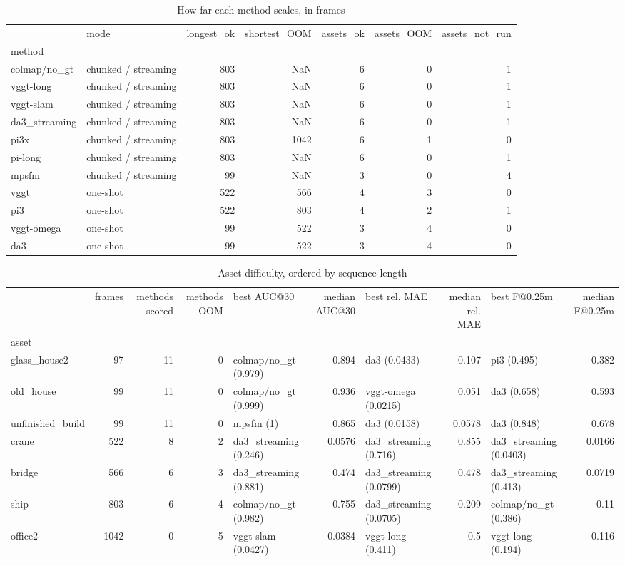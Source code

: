 \begin{table}
\caption{How far each method scales, in frames}
\label{tab:t2_scaling}
\begin{tabular}{llrrrrr}
\toprule
 & mode & longest\_ok & shortest\_OOM & assets\_ok & assets\_OOM & assets\_not\_run \\
method &  &  &  &  &  &  \\
\midrule
colmap/no\_gt & chunked / streaming & 803 & NaN & 6 & 0 & 1 \\
vggt-long & chunked / streaming & 803 & NaN & 6 & 0 & 1 \\
vggt-slam & chunked / streaming & 803 & NaN & 6 & 0 & 1 \\
da3\_streaming & chunked / streaming & 803 & NaN & 6 & 0 & 1 \\
pi3x & chunked / streaming & 803 & 1042 & 6 & 1 & 0 \\
pi-long & chunked / streaming & 803 & NaN & 6 & 0 & 1 \\
mpsfm & chunked / streaming & 99 & NaN & 3 & 0 & 4 \\
vggt & one-shot & 522 & 566 & 4 & 3 & 0 \\
pi3 & one-shot & 522 & 803 & 4 & 2 & 1 \\
vggt-omega & one-shot & 99 & 522 & 3 & 4 & 0 \\
da3 & one-shot & 99 & 522 & 3 & 4 & 0 \\
\bottomrule
\end{tabular}
\end{table}


\begin{table}
\caption{Asset difficulty, ordered by sequence length}
\label{tab:t3_asset_difficulty}
\begin{tabular}{lrrrlrlrlr}
\toprule
 & frames & methods scored & methods OOM & best AUC@30 & median AUC@30 & best rel. MAE & median rel. MAE & best F@0.25m & median F@0.25m \\
asset &  &  &  &  &  &  &  &  &  \\
\midrule
glass\_house2 & 97 & 11 & 0 & colmap/no\_gt (0.979) & 0.894 & da3 (0.0433) & 0.107 & pi3 (0.495) & 0.382 \\
old\_house & 99 & 11 & 0 & colmap/no\_gt (0.999) & 0.936 & vggt-omega (0.0215) & 0.051 & da3 (0.658) & 0.593 \\
unfinished\_build & 99 & 11 & 0 & mpsfm (1) & 0.865 & da3 (0.0158) & 0.0578 & da3 (0.848) & 0.678 \\
crane & 522 & 8 & 2 & da3\_streaming (0.246) & 0.0576 & da3\_streaming (0.716) & 0.855 & da3\_streaming (0.0403) & 0.0166 \\
bridge & 566 & 6 & 3 & da3\_streaming (0.881) & 0.474 & da3\_streaming (0.0799) & 0.478 & da3\_streaming (0.413) & 0.0719 \\
ship & 803 & 6 & 4 & colmap/no\_gt (0.982) & 0.755 & da3\_streaming (0.0705) & 0.209 & colmap/no\_gt (0.386) & 0.11 \\
office2 & 1042 & 0 & 5 & vggt-slam (0.0427) & 0.0384 & vggt-long (0.411) & 0.5 & vggt-long (0.194) & 0.116 \\
\bottomrule
\end{tabular}
\end{table}


